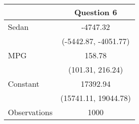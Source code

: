\begin{tabular}{lc}
\toprule
{} &            Question 6 \\
\midrule
Sedan        &              -4747.32 \\
             &  (-5442.87, -4051.77) \\
MPG          &                158.78 \\
             &      (101.31, 216.24) \\
Constant     &              17392.94 \\
             &  (15741.11, 19044.78) \\
Observations &                  1000 \\
\bottomrule
\end{tabular}

